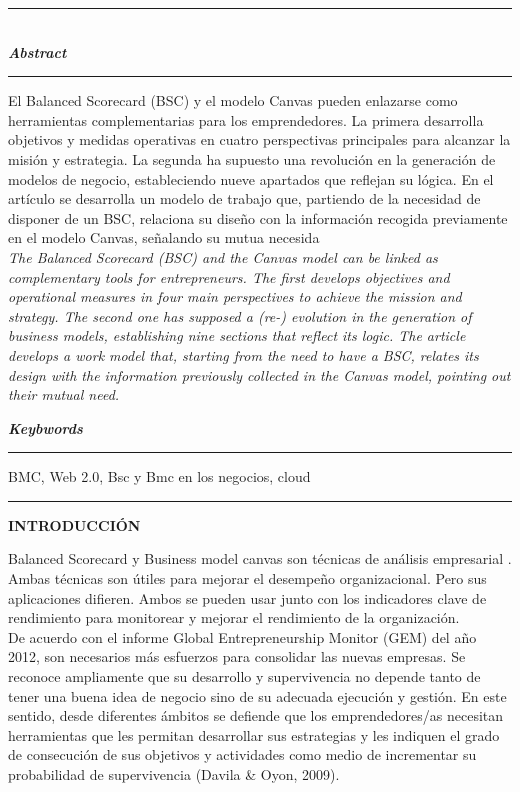 \documentclass[10pt,a4paper]{article}
\begin{document}
		\rule{167mm}{0.1mm}\\
		
		\textbf{\textit{\large Abstract}}\rule[1.5mm]{5mm}{0.1mm} El Balanced Scorecard (BSC) y el modelo Canvas pueden enlazarse como herramientas complementarias para los emprendedores. La primera desarrolla objetivos y medidas operativas en cuatro perspectivas principales para alcanzar la misión y estrategia. La segunda ha supuesto una revolución en la generación de modelos de negocio, estableciendo nueve apartados que reflejan su lógica. En el artículo se desarrolla un modelo de trabajo que, partiendo de la necesidad de disponer de un BSC, relaciona su diseño con la información recogida previamente en el modelo Canvas, señalando su mutua necesida\\
		
		\textit{The Balanced Scorecard (BSC) and the Canvas model can be linked as complementary tools for entrepreneurs. The first develops objectives and operational measures in four main perspectives to achieve the mission and strategy. The second one has supposed a (re-) evolution in the generation of business models, establishing nine sections that reflect its logic. The article develops a work model that, starting from the need to have a BSC, relates its design with the information previously collected in the Canvas model, pointing out their mutual need.}
				
		\vspace{\baselineskip}
		
		\textbf{\textit{\large Keybwords}}\rule[1.5mm]{5mm}{0.1mm} BMC, Web 2.0, Bsc y Bmc en los negocios, cloud
						
		\rule{167mm}{0.1mm}
		
		\vspace{\baselineskip}
		
		\begin{center}
			\textbf{INTRODUCCIÓN}
		\end{center}
		
		
		
		Balanced Scorecard y Business model canvas son técnicas de análisis empresarial . Ambas técnicas son útiles para mejorar el desempeño organizacional. Pero sus aplicaciones difieren. Ambos se pueden usar junto con los indicadores clave de rendimiento para monitorear y mejorar el rendimiento de la organización.\\
		
		De acuerdo con el informe Global Entrepreneurship Monitor (GEM) del año 2012, son necesarios más esfuerzos para consolidar las nuevas empresas. Se reconoce ampliamente que su desarrollo y supervivencia no depende tanto de tener una buena idea de negocio sino de su adecuada ejecución y gestión. En este sentido, desde diferentes ámbitos se defiende que los emprendedores/as necesitan herramientas que les permitan desarrollar sus estrategias y les indiquen el grado de consecución de sus objetivos y actividades como medio de incrementar su probabilidad de supervivencia (Davila \& Oyon, 2009).\\
		
\end{document}
